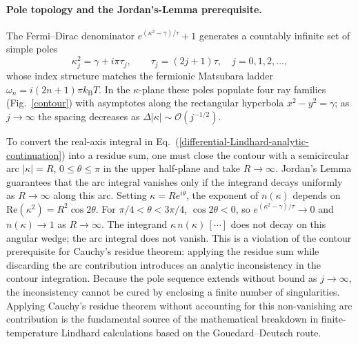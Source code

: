 \documentclass[aps,showkeys,noshowpacs,superscriptaddress,pre,preprint]{revtex4-2}
\begin{document}
\paragraph{Pole topology and the Jordan's-Lemma prerequisite.}
The Fermi--Dirac denominator $e^{\left(\kappa^2 - \gamma\right)/\tau} + 1$
generates a countably infinite set of simple poles
\begin{equation}
\kappa_j^2 = \gamma + i \pi \tau_j , \qquad \tau_j = \left( 2j + 1 \right) \tau ,
\quad j = 0, 1, 2, \ldots ,
\end{equation}
whose index structure matches the fermionic Matsubara ladder
$\omega_n = i \left( 2n + 1 \right) \pi k_\mathrm{B} T$.
In the $\kappa$-plane these poles populate four ray families (Fig.~\ref{contour})
with asymptotes along the rectangular hyperbola $x^2 - y^2 = \gamma$;
as $j \to \infty$ the spacing decreases as $\Delta |\kappa| \sim \mathcal{O}(j^{-1/2})$.

To convert the real-axis integral in Eq.~(\ref{differential-Lindhard-analytic-continuation})
into a residue sum, one must close the contour with a semicircular arc
$|\kappa| = R$, $0 \le \theta \le \pi$ in the upper half-plane and take $R \to \infty$.
Jordan's Lemma \cite{Jordan1894,Arfken-Weber1995} guarantees that the arc integral vanishes
only if the integrand decays uniformly as $R \to \infty$ along this arc.
Setting $\kappa = R e^{i\theta}$, the exponent of $n(\kappa)$ depends on
$\mathrm{Re}\!\left(\kappa^2\right) = R^2 \cos 2\theta$.
For $\pi/4 < \theta < 3\pi/4$, $\cos 2\theta < 0$, so
$e^{\left(\kappa^2 - \gamma\right)/\tau} \to 0$ and $n(\kappa) \to 1$ as $R \to \infty$.
The integrand $\kappa\, n(\kappa)\,[\cdots]$ does not decay on this angular wedge;
the arc integral does not vanish.
This is a violation of the contour prerequisite for Cauchy's residue theorem:
applying the residue sum while discarding the arc contribution introduces an
analytic inconsistency in the contour integration.
Because the pole sequence extends without bound as $j \to \infty$,
the inconsistency cannot be cured by enclosing a finite number of singularities.
Applying Cauchy's residue theorem without accounting for this non-vanishing arc contribution
is the fundamental source of the mathematical breakdown in finite-temperature Lindhard calculations
based on the Gouedard--Deutsch route.
\end{document}
